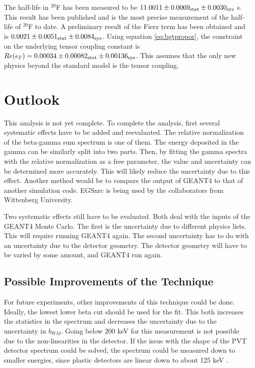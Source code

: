 \documentclass[../MaxHughesThesis.tex]{subfiles}
\begin{document}
The half-life in $^{20}$F has been measured to be  $11.0011 \pm   0.0069_{\rm{stat}}  \pm 0.0030_{\rm{sys}}$ s.
This result has been published and is the most precise measurement of the half-life of $^{20}$F to date.
A preliminary result of the Fierz term has been obtained and is $0.0021 \pm 0.0051_{\rm{stat}} \pm 0.0084_{\rm{sys}}$.
Using equation \ref{eq:bgtpropor}, the constraint on the underlying tensor coupling constant is $Re(\epsilon_{T}) = 0.00034 \pm 0.00082_{\rm{stat}} \pm 0.00136_{\rm{sys}}$.
This assumes that the only new physics beyond the standard model is the tensor coupling. 

\section{Outlook}
This analysis is not yet complete.
To complete the analysis, first several systematic effects have to be added and reevaluated.
The relative normalization of the beta-gamma sum spectrum is one of them. 
The energy deposited in the gamma can be similarly split into two parts.
Then, by fitting the gamma spectra with the relative normalization as a free parameter, the value and uncertainty can be determined more accurately.
This will likely reduce the uncertainty due to this effect.
Another method would be to compare the output of GEANT4 to that of another simulation code.
EGSnrc is being used by the collaborators from Wittenberg University. 

Two systematic effects still have to be evaluated.
Both deal with the inputs of the GEANT4 Monte Carlo.
The first is the uncertainty due to different physics lists. 
This will require running GEANT4 again.
The second uncertainty has to do with an uncertainty due to the detector geometry.
The detector geometry will have to be varied by some amount, and GEANT4 run again.

\subsection{Possible Improvements of the Technique}
For future experiments, other improvements of this technique could be done.
Ideally, the lowest lower beta cut should be used for the fit.
This both increases the statistics in the spectrum and decreases the uncertainty due to the uncertainty in $b_{WM}$.
Going below $200$ keV for this measurement is not possible due to the non-linearities in the detector.
If the issue with the shape of the PVT detector spectrum could be solved, the spectrum could be measured down to smaller energies, since plastic detectors are linear down to about 125 keV \cite{Kno10}. 
\end{document}
